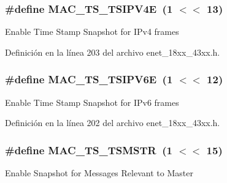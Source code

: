 \subsubsection[{\texorpdfstring{M\+A\+C\+\_\+\+T\+S\+\_\+\+T\+S\+I\+P\+V4E}{MAC_TS_TSIPV4E}}]{\setlength{\rightskip}{0pt plus 5cm}\#define M\+A\+C\+\_\+\+T\+S\+\_\+\+T\+S\+I\+P\+V4E~(1 $<$$<$ 13)}\hypertarget{group___e_n_e_t__18_x_x__43_x_x_gade9b01bf13e02f5bdb02e6f5d3b32400}{}\label{group___e_n_e_t__18_x_x__43_x_x_gade9b01bf13e02f5bdb02e6f5d3b32400}
Enable Time Stamp Snapshot for I\+Pv4 frames 

Definición en la línea 203 del archivo enet\+\_\+18xx\+\_\+43xx.\+h.

\subsubsection[{\texorpdfstring{M\+A\+C\+\_\+\+T\+S\+\_\+\+T\+S\+I\+P\+V6E}{MAC_TS_TSIPV6E}}]{\setlength{\rightskip}{0pt plus 5cm}\#define M\+A\+C\+\_\+\+T\+S\+\_\+\+T\+S\+I\+P\+V6E~(1 $<$$<$ 12)}\hypertarget{group___e_n_e_t__18_x_x__43_x_x_gae07501ba4d7661bb46e26351df9ccebc}{}\label{group___e_n_e_t__18_x_x__43_x_x_gae07501ba4d7661bb46e26351df9ccebc}
Enable Time Stamp Snapshot for I\+Pv6 frames 

Definición en la línea 202 del archivo enet\+\_\+18xx\+\_\+43xx.\+h.

\subsubsection[{\texorpdfstring{M\+A\+C\+\_\+\+T\+S\+\_\+\+T\+S\+M\+S\+TR}{MAC_TS_TSMSTR}}]{\setlength{\rightskip}{0pt plus 5cm}\#define M\+A\+C\+\_\+\+T\+S\+\_\+\+T\+S\+M\+S\+TR~(1 $<$$<$ 15)}\hypertarget{group___e_n_e_t__18_x_x__43_x_x_gaf8c24e7dd79092ce2716a87c42a88927}{}\label{group___e_n_e_t__18_x_x__43_x_x_gaf8c24e7dd79092ce2716a87c42a88927}
Enable Snapshot for Messages Relevant to Master 

